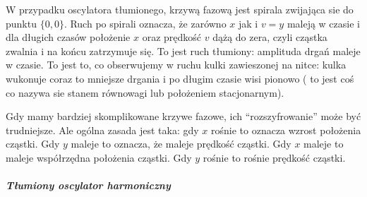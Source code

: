\documentclass[a4paper,12pt,polish]{sphinxmanual}
\begin{document}
W przypadku oscylatora tłumionego, krzywą fazową jest spirala zwijająca sie do punktu $\{0, 0\}$. Ruch po spirali oznacza, że zarówno $x$ jak i $v=y$ maleją w czasie i dla długich czasów położenie $x$ oraz prędkość $v$ dążą do zera, czyli cząstka zwalnia i na końcu zatrzymuje się. To jest ruch tłumiony: amplituda drgań maleje w czasie. To jest to, co obserwujemy w ruchu kulki zawieszonej na nitce: kulka wukonuje coraz to mniejsze drgania i po długim czasie wisi pionowo ( to jest coś co nazywa sie stanem równowagi lub położeniem stacjonarnym).

Gdy mamy bardziej skomplikowane krzywe fazowe, ich ``rozszyfrowanie'' może być trudniejsze. Ale ogólna zasada jest taka: gdy $x$ rośnie to oznacza wzrost położenia cząstki. Gdy $y$ maleje to oznacza, że maleje prędkość cząstki.  Gdy $x$ maleje to maleje współrzędna położenia cząstki. Gdy $y$ rośnie to rośnie prędkość cząstki.


\subparagraph{Tłumiony oscylator harmoniczny}
\label{ch1/chI021:id1}
\end{document}
